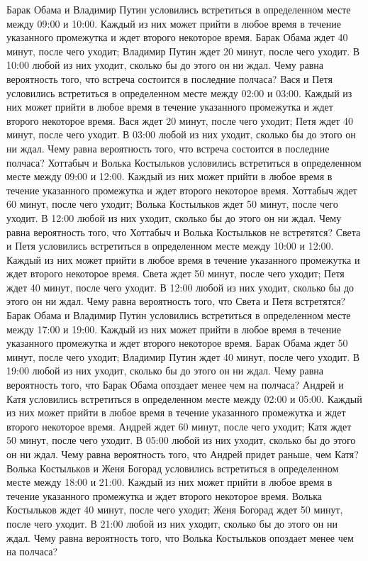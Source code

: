 Барак Обама и Владимир Путин условились встретиться в определенном месте между 09:00 и 10:00. Каждый из них может прийти в любое время в течение указанного промежутка и ждет второго некоторое время. Барак Обама ждет 40 минут, после чего уходит; Владимир Путин ждет 20 минут, после чего уходит. В 10:00 любой из них уходит, сколько бы до этого он ни ждал. Чему равна вероятность того, что встреча состоится в последние полчаса?
Вася и Петя условились встретиться в определенном месте между 02:00 и 03:00. Каждый из них может прийти в любое время в течение указанного промежутка и ждет второго некоторое время. Вася ждет 20 минут, после чего уходит; Петя ждет 40 минут, после чего уходит. В 03:00 любой из них уходит, сколько бы до этого он ни ждал. Чему равна вероятность того, что встреча состоится в последние полчаса?
Хоттабыч и Волька Костыльков условились встретиться в определенном месте между 09:00 и 12:00. Каждый из них может прийти в любое время в течение указанного промежутка и ждет второго некоторое время. Хоттабыч ждет 60 минут, после чего уходит; Волька Костыльков ждет 50 минут, после чего уходит. В 12:00 любой из них уходит, сколько бы до этого он ни ждал. Чему равна вероятность того, что Хоттабыч и Волька Костыльков не встретятся?
Света и Петя условились встретиться в определенном месте между 10:00 и 12:00. Каждый из них может прийти в любое время в течение указанного промежутка и ждет второго некоторое время. Света ждет 50 минут, после чего уходит; Петя ждет 40 минут, после чего уходит. В 12:00 любой из них уходит, сколько бы до этого он ни ждал. Чему равна вероятность того, что Света и Петя встретятся?
Барак Обама и Владимир Путин условились встретиться в определенном месте между 17:00 и 19:00. Каждый из них может прийти в любое время в течение указанного промежутка и ждет второго некоторое время. Барак Обама ждет 50 минут, после чего уходит; Владимир Путин ждет 40 минут, после чего уходит. В 19:00 любой из них уходит, сколько бы до этого он ни ждал. Чему равна вероятность того, что Барак Обама опоздает менее чем на полчаса?
Андрей и Катя условились встретиться в определенном месте между 02:00 и 05:00. Каждый из них может прийти в любое время в течение указанного промежутка и ждет второго некоторое время. Андрей ждет 60 минут, после чего уходит; Катя ждет 50 минут, после чего уходит. В 05:00 любой из них уходит, сколько бы до этого он ни ждал. Чему равна вероятность того, что Андрей придет раньше, чем Катя?
Волька Костыльков и Женя Богорад условились встретиться в определенном месте между 18:00 и 21:00. Каждый из них может прийти в любое время в течение указанного промежутка и ждет второго некоторое время. Волька Костыльков ждет 40 минут, после чего уходит; Женя Богорад ждет 50 минут, после чего уходит. В 21:00 любой из них уходит, сколько бы до этого он ни ждал. Чему равна вероятность того, что Волька Костыльков опоздает менее чем на полчаса?
